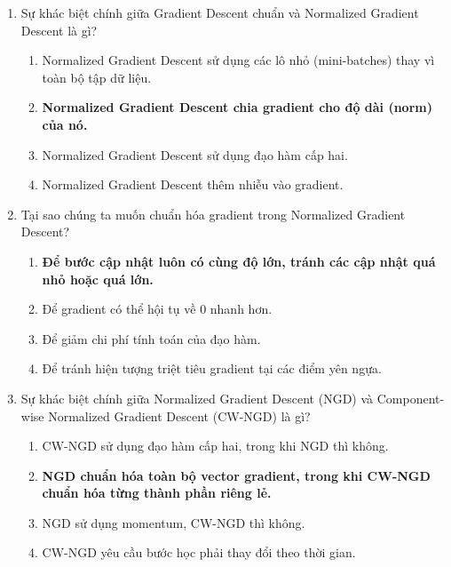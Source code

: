 \documentclass{book}
\begin{document}
\begin{enumerate}
    \item Sự khác biệt chính giữa Gradient Descent chuẩn và Normalized Gradient Descent là gì?
    \begin{multicols}{2}
        \begin{enumerate}[label=\Alph*]
            \item Normalized Gradient Descent sử dụng các lô nhỏ (mini-batches) thay vì toàn bộ tập dữ liệu.
            \item \textbf{Normalized Gradient Descent chia gradient cho độ dài (norm) của nó.}
            \item Normalized Gradient Descent sử dụng đạo hàm cấp hai.
            \item Normalized Gradient Descent thêm nhiễu vào gradient.
        \end{enumerate}
    \end{multicols}

    \item Tại sao chúng ta muốn chuẩn hóa gradient trong Normalized Gradient Descent?
    \begin{multicols}{2}
        \begin{enumerate}[label=\Alph*]
            \item \textbf{Để bước cập nhật luôn có cùng độ lớn, tránh các cập nhật quá nhỏ hoặc quá lớn.}
            \item Để gradient có thể hội tụ về 0 nhanh hơn.
            \item Để giảm chi phí tính toán của đạo hàm.
            \item Để tránh hiện tượng triệt tiêu gradient tại các điểm yên ngựa.
        \end{enumerate}
    \end{multicols}

    \item Sự khác biệt chính giữa Normalized Gradient Descent (NGD) và Component-wise Normalized Gradient Descent (CW-NGD) là gì?
    \begin{multicols}{2}
        \begin{enumerate}[label=\Alph*]
            \item CW-NGD sử dụng đạo hàm cấp hai, trong khi NGD thì không.
            \item \textbf{NGD chuẩn hóa toàn bộ vector gradient, trong khi CW-NGD chuẩn hóa từng thành phần riêng lẻ.}
            \item NGD sử dụng momentum, CW-NGD thì không.
            \item CW-NGD yêu cầu bước học phải thay đổi theo thời gian.
        \end{enumerate}
    \end{multicols}


\end{enumerate}
\end{document}
